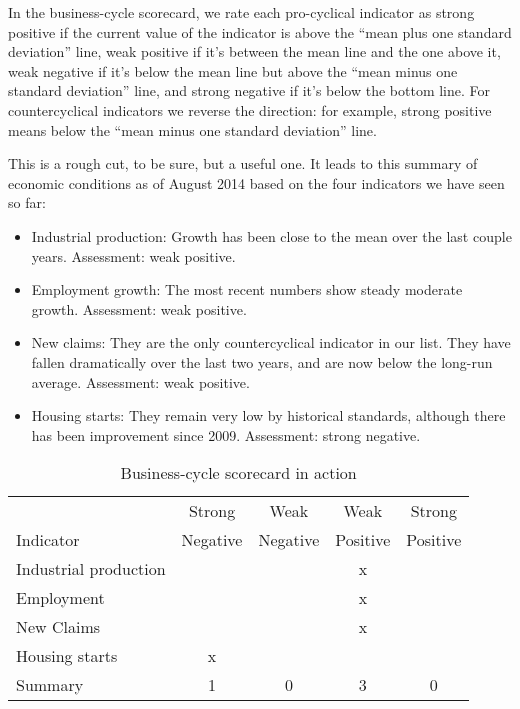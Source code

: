 In the business-cycle scorecard,
we rate each pro-cyclical indicator 
 as strong positive if
the current value of the indicator is above the
``mean plus one standard deviation'' line,
weak positive if it's between the mean line and the one above it,
weak negative if it's below the mean line but above
the ``mean minus one standard deviation'' line,
and strong negative if it's below the bottom line.
For   countercyclical   
 indicators we reverse the direction:
for example, strong positive means below the ``mean minus one standard deviation'' line.

This is a rough cut, to be sure, but a useful one.
It leads to this summary of economic conditions as of August 2014
based on the four indicators we have seen so far:
\begin{itemize}
    \item Industrial production:
    Growth has been close to the mean over the last couple years.
    Assessment:  weak positive.

    \item Employment growth:  The most recent numbers show steady moderate growth.
    Assessment:  weak positive.

    \item New claims:  They are the only countercyclical indicator in our list. They have fallen dramatically over the last two years, and are now below the long-run average.
        Assessment:  weak positive.

    \item Housing starts:  They remain very low by historical standards, although there has been improvement since 2009. Assessment:  strong negative.
\end{itemize}


\begin{table}[!ht]
\centering
\caption{Business-cycle scorecard in action} %
\begin{tabular}{lcccc}
\toprule
            &  Strong    &  Weak  &  Weak   &  Strong  \\
Indicator   &  Negative  & Negative & Positive & Positive \\
\midrule
Industrial production  & &  & x \\
Employment             & &  & x \\
New Claims             && &x \\
Housing starts         & x &  \\
\midrule
Summary                & 1 & 0 & 3 & 0 \\
\bottomrule
\end{tabular}
\label{tab:scorecard}
\end{table}

